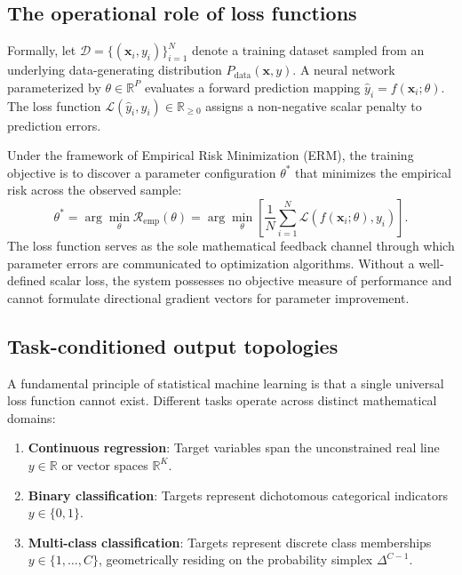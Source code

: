 \documentclass[../../main.tex]{subfiles}
\begin{document}
\subsection{The operational role of loss functions}
\label{subsec:loss_functions_role}

Formally, let $\mathcal{D} = \{(\mathbf{x}_i, y_i)\}_{i=1}^N$ denote a training dataset sampled from an underlying data-generating distribution $P_{\text{data}}(\mathbf{x}, y)$. A neural network parameterized by $\theta \in \mathbb{R}^P$ evaluates a forward prediction mapping $\hat{y}_i = f(\mathbf{x}_i; \theta)$. The loss function $\mathcal{L}(\hat{y}_i, y_i) \in \mathbb{R}_{\ge 0}$ assigns a non-negative scalar penalty to prediction errors.

Under the framework of Empirical Risk Minimization (ERM), the training objective is to discover a parameter configuration $\theta^*$ that minimizes the empirical risk across the observed sample:
\begin{equation}
\theta^* = \arg\min_{\theta} \mathcal{R}_{\text{emp}}(\theta) = \arg\min_{\theta} \left[ \frac{1}{N} \sum_{i=1}^N \mathcal{L}\left( f(\mathbf{x}_i; \theta), y_i \right) \right].
\end{equation}
The loss function serves as the sole mathematical feedback channel through which parameter errors are communicated to optimization algorithms. Without a well-defined scalar loss, the system possesses no objective measure of performance and cannot formulate directional gradient vectors for parameter improvement.

\subsection{Task-conditioned output topologies}
\label{subsec:output_topologies}

A fundamental principle of statistical machine learning is that a single universal loss function cannot exist. Different tasks operate across distinct mathematical domains:
\begin{enumerate}[label=(\roman*)]
    \item \textbf{Continuous regression}: Target variables span the unconstrained real line $y \in \mathbb{R}$ or vector spaces $\mathbb{R}^K$.
    \item \textbf{Binary classification}: Targets represent dichotomous categorical indicators $y \in \{0, 1\}$.
    \item \textbf{Multi-class classification}: Targets represent discrete class memberships $y \in \{1, \dots, C\}$, geometrically residing on the probability simplex $\Delta^{C-1}$.
\end{enumerate}
\end{document}
